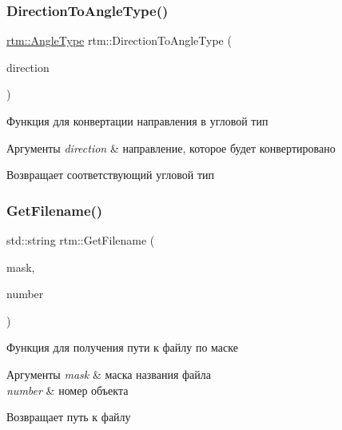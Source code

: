 \subsubsection{\texorpdfstring{Direction\+To\+Angle\+Type()}{DirectionToAngleType()}}
{\footnotesize\ttfamily \hyperlink{namespacertm_a69dc82b16a0148c10962caa83d930f89}{rtm\+::\+Angle\+Type} rtm\+::\+Direction\+To\+Angle\+Type (\begin{DoxyParamCaption}\item[{\hyperlink{namespacertm_a57b216f3aeb45041f3461bab08bc3aeb}{Direction\+Type}}]{direction }\end{DoxyParamCaption})}

Функция для конвертации направления в угловой тип 
\begin{DoxyParams}{Аргументы}
{\em direction} & направление, которое будет конвертировано \\
\hline
\end{DoxyParams}
\begin{DoxyReturn}{Возвращает}
соответствующий угловой тип 
\end{DoxyReturn}
\mbox{\label{namespacertm_a67bf20fe33d85bc05547ff1849aeb29e}} 
\subsubsection{\texorpdfstring{Get\+Filename()}{GetFilename()}}
{\footnotesize\ttfamily std\+::string rtm\+::\+Get\+Filename (\begin{DoxyParamCaption}\item[{std\+::string const \&}]{mask,  }\item[{size\+\_\+t}]{number }\end{DoxyParamCaption})}

Функция для получения пути к файлу по маске 
\begin{DoxyParams}{Аргументы}
{\em mask} & маска названия файла \\
\hline
{\em number} & номер объекта \\
\hline
\end{DoxyParams}
\begin{DoxyReturn}{Возвращает}
путь к файлу 
\end{DoxyReturn}
\mbox{\label{namespacertm_ac1ea2821fc44943e5c35d92e0c9cd5de}} 
